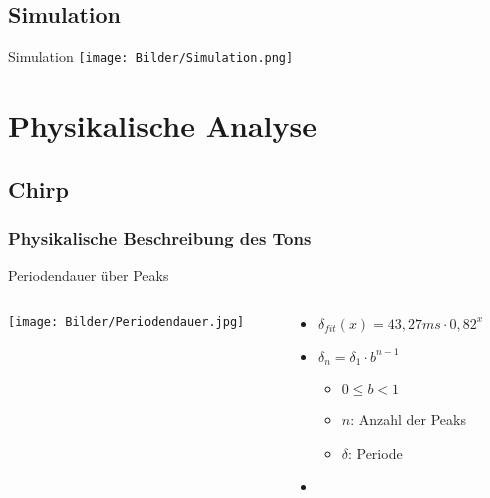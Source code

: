 \documentclass[12pt]{beamer}
\begin{document}
\subsection{Simulation}
\begin{frame}{Simulation}
\texttt{[image: Bilder/Simulation.png]}
\end{frame}
\section{Physikalische Analyse}
\subsection{Chirp}
\subsubsection{Physikalische Beschreibung des Tons}

\begin{frame}{Periodendauer über Peaks}
\begin{columns}
\begin{column}{.55\textwidth}
	\texttt{[image: Bilder/Periodendauer.jpg]}
\end{column}
\begin{column}{.47\textwidth}
	\begin{itemize}
	\item<1-> $\delta_{fit}(x)=43,27ms\cdot 0,82^x$
	\item<2-> $\delta_n=\delta_1\cdot b^{n-1}$
		\begin{itemize}
		\item $0\leq b<1$
		\item $n$: Anzahl der Peaks
		\item $\delta$: Periode
		\end{itemize}
	\item[ ] \ %
	\end{itemize}
\end{column}
\end{columns}
\end{frame}
\end{document}
